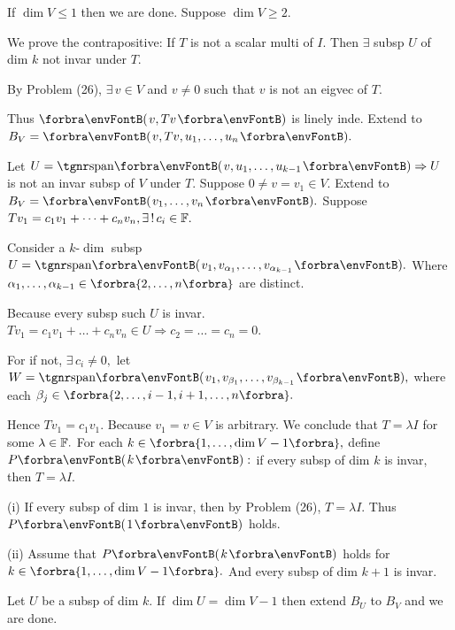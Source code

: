 \documentclass[a4paper, 11pt, UTF8]{article}
\begin{document}
\begin{large}
If $\dim V\leqslant 1$ then we are done. Suppose $\dim V\geqslant 2.$\par\quad
We prove the contrapositive: {\tgsl If $T$ is not a scalar multi of $I$. Then $\exists$ subsp $U$ of dim $k$ not invar under $T.$}\par\quad
By Problem (26), $\exists\,v\in V$ and $v\neq 0$ such that $v$ is not an eigvec of $T.$\par\quad
Thus $\Par{v,Tv}$ is linely inde. Extend to $B_V=\Par{v,Tv,u_1,\dots,u_n}.$\par\quad
Let $U=\Span{v,u_1,\dots,u_{k-1}}\Rightarrow U$ is not an invar subsp of $V$ under $T.$\PfEnd\vspace{6pt}\quad
\Or Suppose $0\neq v=v_1\in V.$ Extend to $B_V=\Par{v_1,\dots,v_n}.$ Suppose $Tv_1=c_1 v_1+\dots+c_n v_n,\exists\,!\,c_i\in{\mathbb{F}}.$\par\quad
Consider a $k$\hspace{1pt}-\hspace{1pt}$\dim$ subsp $U=\Span{v_1,v_{\alpha_1},\dots,v_{\alpha_{k-1}}}.$ Where $\alpha_1,\dots,\alpha_{k-1}\in\Bra{2,\dots,n}$ are distinct.\par\quad
Because every subsp such $U$ is invar. $Tv_1=c_1 v_1+\dots+c_n v_n\in U\Longrightarrow c_2=\dots=c_n=0.$\vspace{0pt}\par\quad
For if not, $\exists\,c_i\neq 0,$ let $W=\Span{v_1,v_{\beta_1},\dots,v_{\beta_{k-1}}},$ where each $\beta_j\in\Bra{{2,\dots,i-1,i+1,\dots,n}}.$\par\quad
Hence $Tv_1=c_1 v_1.$ Because $v_1=v\in V$ is arbitrary. We conclude that $T=\lambda I$ for some $\lambda\in{\mathbb{F}}.$\PfEnd\vspace{6pt}\quad
\Or For each $k\in\Bra{1,\dots,\dim V-1},$ define $P\Par{k}:$ if every subsp of dim $k$ is invar, then $T=\lambda I.$\par\quad
(i) If every subsp of dim $1$ is invar, then by Problem (26), $T=\lambda I.$ Thus $P\Par{1}$ holds.\par\quad\Endi
(ii) Assume that $P\Par{k}$ holds for $k\in\Bra{1,\dots,\dim V-1}.$ And every subsp of dim $k+1$ is invar.\par\quad\Hii
Let $U$ be a subsp of dim $k.$ If $\dim U=\dim V-1$ then extend $B_U$ to $B_V$ and we are done.\par\quad\Hii

\end{large}
\end{document}
